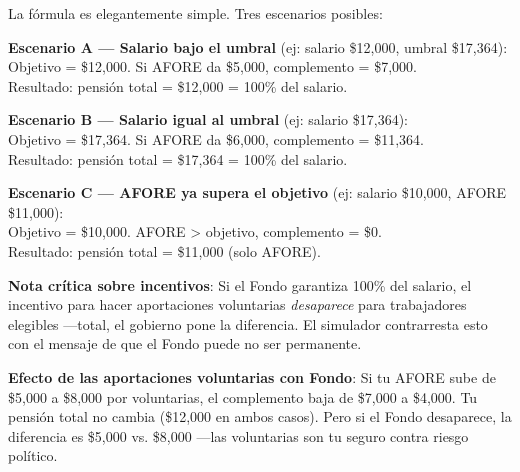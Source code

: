 \documentclass[11pt,a4paper]{report}
\begin{document}
\begin{tcolorbox}[colback=green!5!white, colframe=green!50!black, title=\textbf{Intuici\'on}]
La f\'ormula es elegantemente simple. Tres escenarios posibles:

\textbf{Escenario A --- Salario bajo el umbral} (ej: salario \$12,000, umbral \$17,364):\\
Objetivo = \$12,000. Si AFORE da \$5,000, complemento = \$7,000.\\
Resultado: pensi\'on total = \$12,000 = 100\% del salario.

\textbf{Escenario B --- Salario igual al umbral} (ej: salario \$17,364):\\
Objetivo = \$17,364. Si AFORE da \$6,000, complemento = \$11,364.\\
Resultado: pensi\'on total = \$17,364 = 100\% del salario.

\textbf{Escenario C --- AFORE ya supera el objetivo} (ej: salario \$10,000, AFORE \$11,000):\\
Objetivo = \$10,000. AFORE > objetivo, complemento = \$0.\\
Resultado: pensi\'on total = \$11,000 (solo AFORE).

\textbf{Nota cr\'itica sobre incentivos}: Si el Fondo garantiza 100\% del salario, el incentivo para hacer aportaciones voluntarias \emph{desaparece} para trabajadores elegibles ---total, el gobierno pone la diferencia. El simulador contrarresta esto con el mensaje de que el Fondo puede no ser permanente.

\textbf{Efecto de las aportaciones voluntarias con Fondo}: Si tu AFORE sube de \$5,000 a \$8,000 por voluntarias, el complemento baja de \$7,000 a \$4,000. Tu pensi\'on total no cambia (\$12,000 en ambos casos). Pero si el Fondo desaparece, la diferencia es \$5,000 vs. \$8,000 ---las voluntarias son tu seguro contra riesgo pol\'itico.
\end{tcolorbox}
\end{document}
